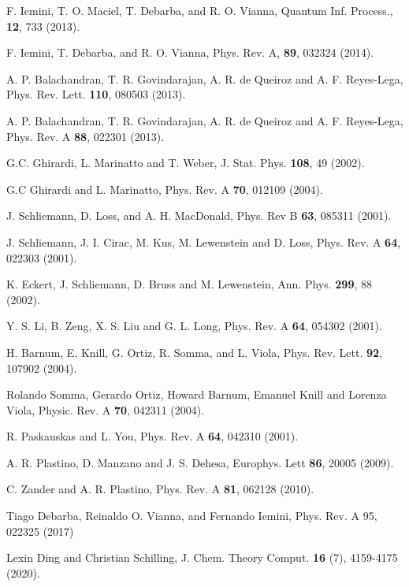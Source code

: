 \documentclass[prb,reprint,showpacs,twocolumn,superscriptaddress]{revtex4-2}
\begin{document}
\begin{thebibliography}{99}
 F. Iemini, T. O. Maciel,
 T. Debarba, and R. O. Vianna, Quantum Inf. Process.,
\textbf{12}, 733 (2013).

 F. Iemini, T. Debarba, and R. O. Vianna, Phys. Rev. A, {\bf 89}, 032324 (2014).

 A. P. Balachandran, T. R. Govindarajan,
 A. R. de Queiroz and A. F. Reyes-Lega,
Phys. Rev. Lett. {\bf 110}, 080503 (2013).

 A. P. Balachandran,
 T. R. Govindarajan, A. R. de Queiroz and A. F. Reyes-Lega,
Phys. Rev. A {\bf 88}, 022301 (2013).

 G.C. Ghirardi, L. Marinatto and T. Weber,
J. Stat. Phys. {\bf 108}, 49 (2002).

 G.C Ghirardi and L. Marinatto,
 Phys. Rev. A {\bf 70}, 012109 (2004).

 J. Schliemann, D. Loss, and A. H. MacDonald,
Phys. Rev B {\bf 63}, 085311 (2001).

 J. Schliemann, J. I. Cirac, M. Kus, M. Lewenstein and D. Loss,
Phys. Rev. A {\bf 64}, 022303 (2001).

 K. Eckert, J. Schliemann, D. Bruss and M. Lewenstein,
Ann. Phys. {\bf 299}, 88 (2002).

 Y. S. Li, B. Zeng, X. S. Liu and G. L. Long,
Phys. Rev. A {\bf 64}, 054302 (2001).

 H. Barnum, E. Knill,
 G. Ortiz, R. Somma, and L. Viola, Phys.
Rev. Lett. \textbf{ 92}, 107902 (2004).

 Rolando Somma, Gerardo Ortiz, Howard Barnum, Emanuel Knill 
and Lorenza Viola, Physic. Rev. A \textbf{70}, 042311 (2004).

 R. Paskauskas and L. You, Phys. Rev. A
\textbf{64}, 042310 (2001).

 A. R. Plastino, D. Manzano and J. S. Dehesa, 
Europhys. Lett \textbf{86}, 20005 (2009).

 C. Zander and A. R. Plastino,
Phys. Rev. A {\bf 81}, 062128 (2010).

 Tiago Debarba, Reinaldo O. Vianna, and Fernando Iemini,  Phys. Rev. A 95, 022325 (2017)

 Lexin Ding and Christian Schilling,
J. Chem. Theory Comput. \textbf{16} (7), 4159-4175 (2020).


\end{thebibliography}
\end{document}
